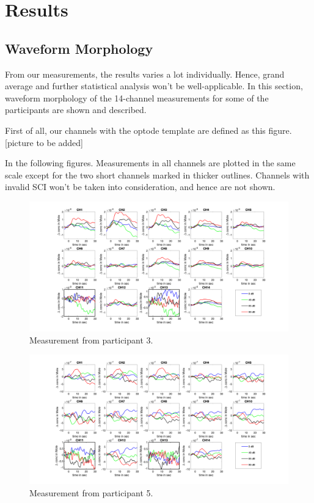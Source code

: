 \chapter{Results}
\section {Waveform Morphology}
From our measurements, the results varies a lot individually. Hence, grand average and further statistical analysis won't be well-applicable. In this section, waveform morphology of the 14-channel measurements for some of the participants are shown and described.

First of all, our channels with the optode template are defined as this figure.
[picture to be added]

In the following figures. Measurements in all channels are plotted in the same scale except for the two short channels marked in thicker outlines. Channels with invalid SCI won't be taken into consideration, and hence are not shown.
\begin{figure}[H]
  \centering
    \includegraphics[scale=.4]{bilder/HbO_Mole/sub_jonas_s_HbO.png}
  \caption{Measurement from participant 3.}
  \label{fig:somesignal}
\end{figure}

\begin{figure}[H]
  \centering
    \includegraphics[scale=.4]{bilder/HbO_Mole/sub_lukas_s_HbO.png}
  \caption{Measurement from participant 5.}
  \label{fig:somesignal}
\end{figure}

